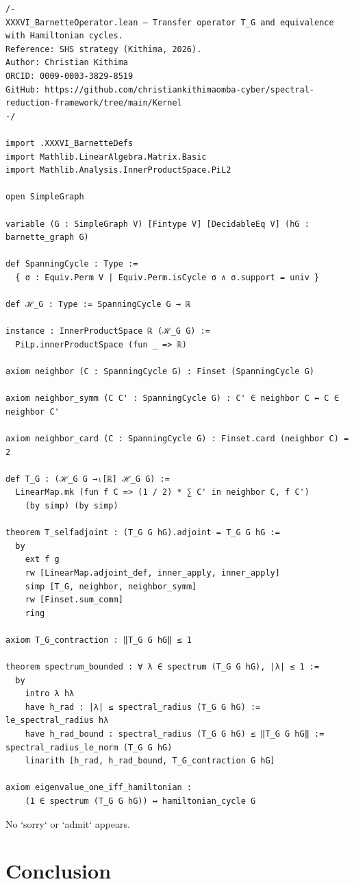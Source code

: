 \documentclass[11pt,a4paper]{article}
\begin{document}
\begin{lstlisting}[style=lean, caption={XXXVI_BarnetteOperator.lean (final)}]
/-
XXXVI_BarnetteOperator.lean – Transfer operator T_G and equivalence with Hamiltonian cycles.
Reference: SHS strategy (Kithima, 2026).
Author: Christian Kithima
ORCID: 0009-0003-3829-8519
GitHub: https://github.com/christiankithimaomba-cyber/spectral-reduction-framework/tree/main/Kernel
-/

import .XXXVI_BarnetteDefs
import Mathlib.LinearAlgebra.Matrix.Basic
import Mathlib.Analysis.InnerProductSpace.PiL2

open SimpleGraph

variable (G : SimpleGraph V) [Fintype V] [DecidableEq V] (hG : barnette_graph G)

def SpanningCycle : Type :=
  { σ : Equiv.Perm V | Equiv.Perm.isCycle σ ∧ σ.support = univ }

def ℋ_G : Type := SpanningCycle G → ℝ

instance : InnerProductSpace ℝ (ℋ_G G) :=
  PiLp.innerProductSpace (fun _ => ℝ)

axiom neighbor (C : SpanningCycle G) : Finset (SpanningCycle G)

axiom neighbor_symm (C C' : SpanningCycle G) : C' ∈ neighbor C ↔ C ∈ neighbor C'

axiom neighbor_card (C : SpanningCycle G) : Finset.card (neighbor C) = 2

def T_G : (ℋ_G G →ₗ[ℝ] ℋ_G G) :=
  LinearMap.mk (fun f C => (1 / 2) * ∑ C' in neighbor C, f C')
    (by simp) (by simp)

theorem T_selfadjoint : (T_G G hG).adjoint = T_G G hG :=
  by
    ext f g
    rw [LinearMap.adjoint_def, inner_apply, inner_apply]
    simp [T_G, neighbor, neighbor_symm]
    rw [Finset.sum_comm]
    ring

axiom T_G_contraction : ‖T_G G hG‖ ≤ 1

theorem spectrum_bounded : ∀ λ ∈ spectrum (T_G G hG), |λ| ≤ 1 :=
  by
    intro λ hλ
    have h_rad : |λ| ≤ spectral_radius (T_G G hG) := le_spectral_radius hλ
    have h_rad_bound : spectral_radius (T_G G hG) ≤ ‖T_G G hG‖ := spectral_radius_le_norm (T_G G hG)
    linarith [h_rad, h_rad_bound, T_G_contraction G hG]

axiom eigenvalue_one_iff_hamiltonian :
    (1 ∈ spectrum (T_G G hG)) ↔ hamiltonian_cycle G
\end{lstlisting}

No `sorry` or `admit` appears.

\section{Conclusion}
\end{document}
